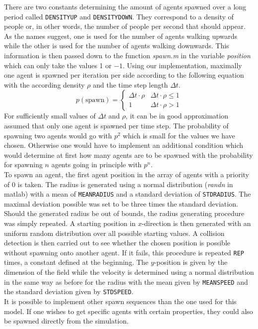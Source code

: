 \noi There are two constants determining the amount of agents spawned over a long period called \texttt{DENSITYUP} and \texttt{DENSITYDOWN}. They correspond to a density of people or, in other words, the number of people per second that should appear. As the names suggest, one is used for the number of agents walking upwards while the other is used for the number of agents walking downwards. This information is then passed down to the function \textit{spawn.m} in the variable \textit{position} which can only take the values 1 or $-1$. Using our implementation, maximally one agent is spawned per iteration per side according to the following equation with the according density $\rho$ and the time step length $\Delta t$.
\begin{equation}\label{iteration1}
	p(\text{spawn}) = \left\{\begin{array}{cc}\Delta t \cdot \rho&\Delta t \cdot \rho \leq 1\\1&\Delta t \cdot \rho > 1\end{array}\right.
\end{equation}
\noi For sufficiently small values of $\Delta t$ and $\rho$, it can be in good approximation assumed that only one agent is spawned per time step. The probability of spawning two agents would go with $p^2$ which is small for the values we have chosen. Otherwise one would have to implement an additional condition which would determine at first how many agents are to be spawned with the probability for spawning $n$ agents going in principle with $p^n$.\\

\noi To spawn an agent, the first agent position in the array of agents with a priority of 0 is taken. The radius is generated using a normal distribution (\textit{randn} in matlab) with a mean of \texttt{MEANRADIUS} and a standard deviation of \texttt{STDRADIUS}. The maximal deviation possible was set to be three times the standard deviation. Should the generated radius be out of bounds, the radius generating procedure was simply repeated. A starting position in $x$-direction is then generated with an uniform random distribution over all possible starting values. A collision detection is then carried out to see whether the chosen position is possible without spawning onto another agent. If it fails, this procedure is repeated \texttt{REP} times, a constant defined at the beginning. The $y$-position is given by the dimension of the field while the velocity is determined using a normal distribution in the same way as before for the radius with the mean given by \texttt{MEANSPEED} and the standard deviation given by \texttt{STDSPEED}.\\

\noi It is possible to implement other spawn sequences than the one used for this model. If one wishes to get specific agents with certain properties, they could also be spawned directly from the simulation.
